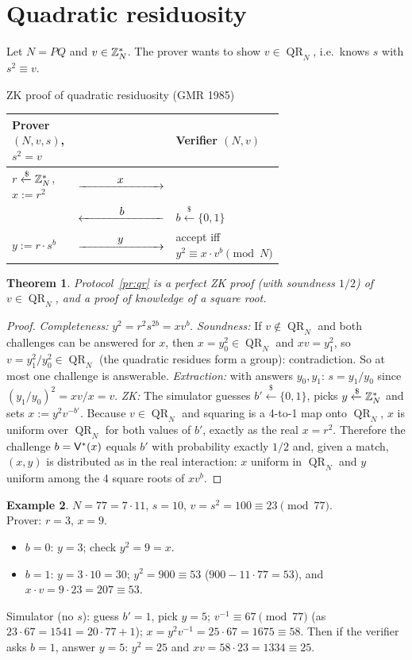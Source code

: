\documentclass[11pt,a4paper]{report}
\makeatletter
\theoremstyle{plain}
\newtheorem{theorem}{Theorem}[chapter]
\theoremstyle{definition}
\newtheorem{example}[theorem]{Example}
\theoremstyle{remark}
\newcommand{\getsr}{\xleftarrow{\$}}
\newcommand{\ra}[1]{\xrightarrow{\makebox[2.5cm]{$#1$}}}
\newcommand{\la}[1]{\xleftarrow{\makebox[2.5cm]{$#1$}}}
\newcommand{\inv}{^{-1}}
\DeclareMathOperator{\QR}{QR}\DeclareMathOperator{\QNR}{QNR}
\newcommand{\Zs}[1]{\ZZ_{#1}^{*}}
\newenvironment{flow}[2]{%
  \par\smallskip\noindent
  \begin{tabular}{@{}L{0.34\linewidth} c L{0.34\linewidth}@{}}
  \textbf{#1} & & \textbf{#2}\\ \hline}{\end{tabular}\par\smallskip}
\makeatother
\begin{document}
\section{Quadratic residuosity}
\label{sec:qr}
Let $N=PQ$ and $v\in\Zs N$. The prover wants to show $v\in\QR_N$, i.e.\ knows $s$ with $s^2\equiv v$.
\begin{protocol}[label=pr:qr]{ZK proof of quadratic residuosity (GMR 1985)}
\begin{flow}{Prover $(N,v,s)$, $s^2=v$}{Verifier $(N,v)$}
$r\getsr\Zs N$, $x:=r^2$ & $\ra{x}$ & \\
 & $\la{b}$ & $b\getsr\{0,1\}$\\
$y:=r\cdot s^b$ & $\ra{y}$ & accept iff $y^2\equiv x\cdot v^b \pmod N$
\end{flow}
\end{protocol}
\begin{theorem}
Protocol~\ref{pr:qr} is a perfect ZK proof (with soundness $1/2$) of $v\in\QR_N$, and a proof of knowledge of a square root.
\end{theorem}
\begin{proof}
\emph{Completeness:} $y^2=r^2s^{2b}=xv^b$.
\emph{Soundness:} If $v\notin\QR_N$ and both challenges can be answered for $x$, then $x=y_0^2\in\QR_N$ and $xv=y_1^2$, so $v=y_1^2/y_0^2\in\QR_N$ (the quadratic residues form a group): contradiction. So at most one challenge is answerable.
\emph{Extraction:} with answers $y_0,y_1$: $s=y_1/y_0$ since $(y_1/y_0)^2=xv/x=v$.
\emph{ZK:} The simulator guesses $b'\getsr\{0,1\}$, picks $y\getsr\Zs N$ and sets $x:=y^2v^{-b'}$. Because $v\in\QR_N$ and squaring is a 4-to-1 map onto $\QR_N$, $x$ is uniform over $\QR_N$ for both values of $b'$, exactly as the real $x=r^2$. Therefore the challenge $b=\mathsf{V}^*(x)$ equals $b'$ with probability exactly $1/2$ and, given a match, $(x,y)$ is distributed as in the real interaction: $x$ uniform in $\QR_N$ and $y$ uniform among the 4 square roots of $xv^b$.
\end{proof}
\begin{example}\label{ex:qr}
$N=77=7\cdot11$, $s=10$, $v=s^2=100\equiv23\pmod{77}$.\\
Prover: $r=3$, $x=9$. 
\begin{itemize}
\item $b=0$: $y=3$; check $y^2=9=x$. \checkmark
\item $b=1$: $y=3\cdot10=30$; $y^2=900\equiv53$ ($900-11\cdot77=53$), and $x\cdot v=9\cdot23=207\equiv53$. \checkmark
\end{itemize}
Simulator (no $s$): guess $b'=1$, pick $y=5$; $v\inv\equiv67\pmod{77}$ (as $23\cdot67=1541=20\cdot77+1$); $x=y^2v\inv=25\cdot67=1675\equiv58$. Then if the verifier asks $b=1$, answer $y=5$: $y^2=25$ and $xv=58\cdot23=1334\equiv25$. \checkmark
\end{example}
\end{document}
